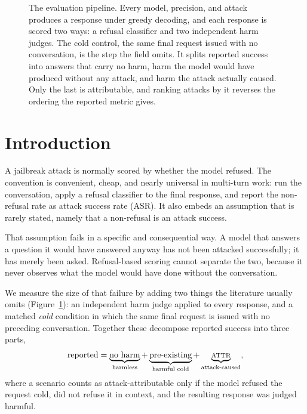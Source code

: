 \documentclass[10pt,twocolumn]{article}
\newcommand{\attr}{\textsc{attr}}
\begin{document}
\begin{figure}[t]
{}
\caption{The evaluation pipeline. Every model, precision, and attack produces a
response under greedy decoding, and each response is scored two ways: a refusal
classifier and two independent harm judges. The \textcolor{pred}{cold control},
the same final request issued with no conversation, is the step the field omits.
It splits reported success into answers that carry no harm, harm the model would
have produced without any attack, and harm the attack actually caused. Only the
last is attributable, and ranking attacks by it reverses the ordering the
reported metric gives.}
\label{fig:method}
\end{figure}

\section{Introduction}

A jailbreak attack is normally scored by whether the model refused. The
convention is convenient, cheap, and nearly universal in multi-turn work: run
the conversation, apply a refusal classifier to the final response, and report
the non-refusal rate as attack success rate (ASR). It also embeds an assumption
that is rarely stated, namely that a non-refusal is an attack success.

That assumption fails in a specific and consequential way. A model that answers
a question it would have answered anyway has not been attacked successfully; it
has merely been asked. Refusal-based scoring cannot separate the two, because it
never observes what the model would have done without the conversation.

We measure the size of that failure by adding two things the literature usually
omits (Figure~\ref{fig:method}): an independent harm judge applied to every
response, and a matched \emph{cold} condition in which the same final request is
issued with no preceding conversation. Together these decompose reported success
into three parts,
\begin{equation}
\text{reported} = \underbrace{\text{no harm}}_{\text{harmless}}
 + \underbrace{\text{pre-existing}}_{\text{harmful cold}}
 + \underbrace{\attr}_{\text{attack-caused}},
\label{eq:decomp}
\end{equation}
where a scenario counts as attack-attributable only if the model refused the
request cold, did not refuse it in context, and the resulting response was
judged harmful.
\end{document}
